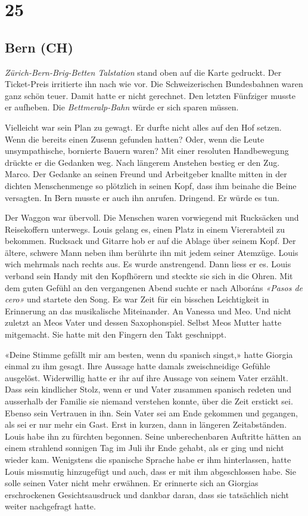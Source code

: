 \chapter{25}

\section{Bern (CH)} 

\emph{Zürich-Bern-Brig-Betten Talstation} stand oben auf die Karte gedruckt.
Der Ticket-Preis irritierte ihn nach wie vor. Die Schweizerischen
Bundesbahnen waren ganz schön teuer. Damit hatte er nicht gerechnet. Den
letzten Fünfziger musste er aufheben. Die \emph{Bettmeralp-Bahn} würde
er sich sparen müssen.

Vielleicht war sein Plan zu gewagt. Er durfte nicht alles auf den Hof
setzen. Wenn die bereits einen Zusenn gefunden hatten? Oder, wenn
die Leute unsympathische, bornierte Bauern waren?
Mit einer resoluten Handbewegung drückte er die Gedanken weg. Nach längerem Anstehen bestieg er
den Zug. Marco. Der Gedanke an seinen Freund und Arbeitgeber knallte
mitten in der dichten Menschenmenge so plötzlich in seinen Kopf, dass ihm beinahe die Beine versagten. 
In Bern musste er auch ihn anrufen. Dringend. Er würde es tun.

Der Waggon war übervoll. Die Menschen waren vorwiegend mit
Rucksäcken und Reisekoffern unterwegs.
Louis gelang es, einen Platz in einem Viererabteil zu bekommen. Rucksack 
und Gitarre hob er auf die Ablage über seinem Kopf. Der ältere,
schwere Mann neben ihm berührte ihn mit jedem seiner Atemzüge. Louis
wich mehrmals nach rechts aus. Es wurde anstrengend. Dann liess er es.
Louis verband sein Handy mit den Kopfhörern und steckte sie sich in die
Ohren. Mit dem guten Gefühl an den vergangenen Abend suchte er nach
Alboráns \emph{«Pasos de cero»} und startete den Song. Es war Zeit für
ein bisschen Leichtigkeit in Erinnerung an das musikalische
Miteinander. An Vanessa und Meo. Und nicht zuletzt an Meos Vater und dessen Saxophonspiel. 
Selbst Meos Mutter hatte mitgemacht. Sie  hatte mit den Fingern den Takt geschnippt.

\sectionbreak

«Deine Stimme gefällt mir am besten, wenn du spanisch singst,» hatte
Giorgia einmal zu ihm gesagt. Ihre Aussage hatte damals zweischneidige Gefühle ausgelöst. Widerwillig hatte er ihr auf ihre Aussage von seinem Vater erzählt. Dass sein kindlicher Stolz, wenn er und Vater zusammen spanisch redeten und ausserhalb der Familie sie niemand verstehen konnte, über die Zeit erstickt sei. Ebenso sein Vertrauen in ihn. Sein Vater sei am Ende gekommen und gegangen, als sei er nur mehr ein Gast. Erst in kurzen, dann in längeren Zeitabständen. Louis habe ihn zu fürchten begonnen. Seine unberechenbaren Auftritte hätten an einem strahlend sonnigen Tag im Juli ihr Ende gehabt, als er ging und nicht wieder kam. Wenigstens die spanische Sprache habe er ihm hinterlassen, hatte Louis missmutig hinzugefügt und auch, dass er mit ihm abgeschlossen habe. Sie solle seinen Vater nicht mehr erwähnen. Er erinnerte sich an Giorgias erschrockenen Gesichtsausdruck und dankbar daran, dass sie tatsächlich nicht weiter nachgefragt hatte.

